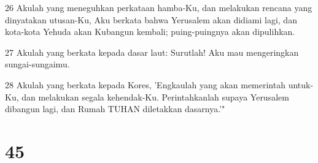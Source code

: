 \par 26 Akulah yang meneguhkan perkataan hamba-Ku, dan melakukan rencana yang dinyatakan utusan-Ku, Aku berkata bahwa Yerusalem akan didiami lagi, dan kota-kota Yehuda akan Kubangun kembali; puing-puingnya akan dipulihkan.
\par 27 Akulah yang berkata kepada dasar laut: Surutlah! Aku mau mengeringkan sungai-sungaimu.
\par 28 Akulah yang berkata kepada Kores, 'Engkaulah yang akan memerintah untuk-Ku, dan melakukan segala kehendak-Ku. Perintahkanlah supaya Yerusalem dibangun lagi, dan Rumah TUHAN diletakkan dasarnya.'"

\chapter{45}

